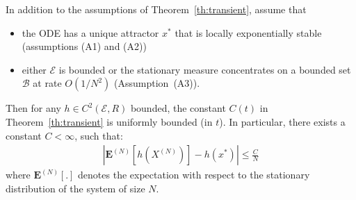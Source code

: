 \documentclass[sigconf]{acmart}
\newcommand\XN{X^{(N)}}
\newcommand\E{\mathcal{E}}
\newcommand\calB{\mathcal{B}}
\newcommand\espN[1]{\mathbf{E}^{(N)}\left[#1\right]}
\newcommand\abs[1]{\left|#1\right|}
\begin{document}
\begin{theorem}
  \label{th:stationary}
  In addition to the assumptions of Theorem~\ref{th:transient}, assume
  that
  \begin{itemize}
  \item the ODE has a unique attractor $x^*$ that is locally
    exponentially stable (assumptions (A1) and (A2))
  \item either $\E$ is bounded or the stationary measure concentrates
    on a bounded set $\calB$ at rate $O(1/N^2)$ (Assumption~(A3)).
  \end{itemize}
  Then for any $h\in C^{2}(\E,R)$ bounded, the constant $C(t)$ in
  Theorem~\ref{th:transient} is uniformly bounded (in $t$). In
  particular, there exists a constant $C<\infty$, such that:
  \begin{align}
    \label{eq:th_stationary}
    \abs{\espN{h(\XN)}-h(x^*)} \le \frac{C}{N}
  \end{align}
  where $\espN{.}$ denotes the expectation with respect to the
  stationary distribution of the system of size $N$.
\end{theorem}
\end{document}
